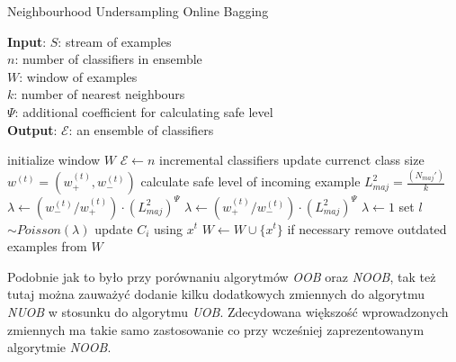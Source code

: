 \begin{algorithm}
    \caption{Neighbourhood Undersampling Online Bagging}\label{Algorithm:NUOB}
    \textbf{Input}: $S$: stream of examples \\
    \hspace*{12mm} $n$: number of classifiers in ensemble \\
    \hspace*{12mm} $W$: window of examples \\
    \hspace*{12mm} $k$: number of nearest neighbours \\
    \hspace*{12mm} $\Psi$: additional coefficient for calculating safe level \\
    \textbf{Output}: $\mathcal{E}$: an ensemble of classifiers \\
    \begin{algorithmic}[1]
    \State initialize window $W$
    \State $\mathcal{E} \gets n$ incremental classifiers
    \State update currenct class size $w^{(t)} = (w^{(t)}_{+}, w^{(t)}_{-})$
    \State calculate safe level of incoming example $L^2_{maj} = \frac{(N_{maj}')}{k}$
    \vspace{0.5em}
    \State $\lambda \gets (w^{(t)}_{-}/w^{(t)}_{+}) \cdot (L^2_{maj})^{\Psi}$
    \vspace{0.5em}
    \vspace{0.5em}
    \State $\lambda \gets (w^{(t)}_{+}/w^{(t)}_{-}) \cdot (L^2_{maj})^{\Psi}$
    \vspace{0.4em}
    \Else
    \State $\lambda \gets 1$
    \EndIf
    \State set $l$ $\sim Poisson(\lambda)$
    \State update $C_i$ using $x^t$
    \EndFor
    \EndFor
    \State $W \gets W \cup \{x^t\}$
    \State if necessary remove outdated examples from $W$
    \EndFor
    \end{algorithmic}
\end{algorithm}

\noindent Podobnie jak to było przy porównaniu algorytmów \textit{OOB} oraz \textit{NOOB}, tak też tutaj można zauważyć dodanie kilku dodatkowych zmiennych do algorytmu \textit{NUOB} w stosunku do algorytmu \textit{UOB}. Zdecydowana większość wprowadzonych zmiennych ma takie samo zastosowanie co przy wcześniej zaprezentowanym algorytmie \textit{NOOB}.

